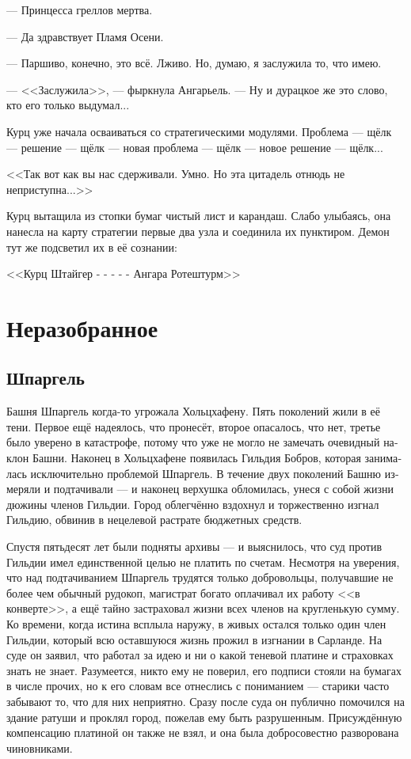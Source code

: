 \documentclass[a4paper,12pt,fleqn]{book}\usepackage{polyglossia}\setdefaultlanguage[babelshorthands=true]{russian}\setotherlanguage{english}\defaultfontfeatures{Ligatures=TeX,Mapping=tex-text}\usepackage{xcolor}\newcommand{\ml}[3]{#2}
\begin{document}
\ml{$0$}
{--- Принцесса греллов мертва.}
{``The Grello Princess is dead.''}

\ml{$0$}
{--- Да здравствует Пламя Осени.}
{``Long live the Flame of the Fall.''}

--- Паршиво, конечно, это всё.
Лживо.
Но, думаю, я заслужила то, что имею.

--- <<Заслужила>>, --- фыркнула Ангарьель.
--- Ну и дурацкое же это слово, кто его только выдумал...

Курц уже начала осваиваться со стратегическими модулями.
Проблема --- щёлк --- решение --- щёлк --- новая проблема --- щёлк --- новое решение --- щёлк...

<<Так вот как вы нас сдерживали.
Умно.
Но эта цитадель отнюдь не неприступна...>>

Курц вытащила из стопки бумаг чистый лист и карандаш.
Слабо улыбаясь, она нанесла на карту стратегии первые два узла и соединила их пунктиром.
\ml{$0$}
{Демон тут же подсветил их в её сознании:}
{The daemon immediately highlighted them in her mind:}

\ml{$0$}
{<<Курц Штайгер - - - - - Ангара Ротештурм>>}
{\textit{Kurz Steiger - - - - - Angara Rotesturm}}

\chapter{Неразобранное}

\section{Шпаргель}

Башня Шпаргель когда-то угрожала Хольцхафену.
Пять поколений жили в её тени.
Первое ещё надеялось, что пронесёт, второе опасалось, что нет, третье было уверено в катастрофе, потому что уже не могло не замечать очевидный наклон Башни.
Наконец в Хольцхафене появилась Гильдия Бобров, которая занималась исключительно проблемой Шпаргель.
В течение двух поколений Башню измеряли и подтачивали --- и наконец верхушка обломилась, унеся с собой жизни дюжины членов Гильдии.
Город облегчённо вздохнул и торжественно изгнал Гильдию, обвинив в нецелевой растрате бюджетных средств.

Спустя пятьдесят лет были подняты архивы --- и выяснилось, что суд против Гильдии имел единственной целью не платить по счетам.
Несмотря на уверения, что над подтачиванием Шпаргель трудятся только добровольцы, получавшие не более чем обычный рудокоп, магистрат богато оплачивал их работу <<в конверте>>, а ещё тайно застраховал жизни всех членов на кругленькую сумму.
Ко времени, когда истина всплыла наружу, в живых остался только один член Гильдии, который всю оставшуюся жизнь прожил в изгнании в Сарланде.
На суде он заявил, что работал за идею и ни о какой теневой платине и страховках знать не знает.
Разумеется, никто ему не поверил, его подписи стояли на бумагах в числе прочих, но к его словам все отнеслись с пониманием --- старики часто забывают то, что для них неприятно.
Сразу после суда он публично помочился на здание ратуши и проклял город, пожелав ему быть разрушенным.
Присуждённую компенсацию платиной он также не взял, и она была добросовестно разворована чиновниками.
\end{document}
